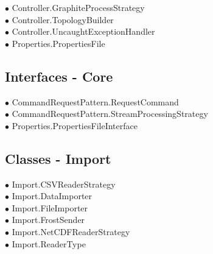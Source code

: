{	\hspace{0.0cm} $\bullet$ Controller.GraphiteProcessStrategy {\tiny {}} \\
	\hspace{0.0cm} $\bullet$ Controller.TopologyBuilder {\tiny {}} \\
	\hspace{0.0cm} $\bullet$ Controller.UncaughtExceptionHandler {\tiny {}} \\
	\hspace{0.0cm} $\bullet$ Properties.PropertiesFile {\tiny {}} \\
}
\subsection*{Interfaces - Core}
\hspace{0.0cm} $\bullet$ CommandRequestPattern.RequestCommand {\tiny {}} \\
\hspace{0.0cm} $\bullet$ CommandRequestPattern.StreamProcessingStrategy {\tiny {}} \\
\hspace{0.0cm} $\bullet$ Properties.PropertiesFileInterface {\tiny {}} \\
\newpage
\subsection*{Classes - Import}
{\raggedright
	\hspace{0.0cm} $\bullet$ Import.CSVReaderStrategy {\tiny {}} \\
	\hspace{0.0cm} $\bullet$ Import.DataImporter {\tiny {}} \\
	\hspace{0.0cm} $\bullet$ Import.FileImporter {\tiny {}} \\
	\hspace{0.0cm} $\bullet$ Import.FrostSender {\tiny {}} \\
	\hspace{0.0cm} $\bullet$ Import.NetCDFReaderStrategy {\tiny {}} \\
	\hspace{0.0cm} $\bullet$ Import.ReaderType {\tiny {}} \\
}

